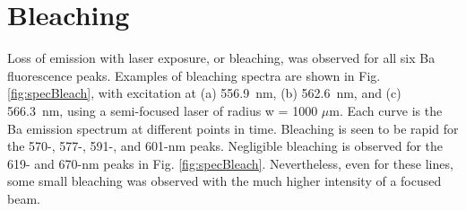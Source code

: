 


\section{Bleaching}
\label{sec:bleaching}

Loss of emission with laser exposure, or bleaching, was observed for all six Ba fluorescence peaks.  Examples of bleaching spectra are shown in Fig. \ref{fig:specBleach}, with excitation at (a) 556.9~nm, (b) 562.6~nm, and (c) 566.3~nm, using a semi-focused laser of radius w = 1000 $\mu$m.  Each curve is the Ba emission spectrum at different points in time.  Bleaching is seen to be rapid for the 570-, 577-, 591-, and 601-nm peaks.  Negligible bleaching is observed for the 619- and 670-nm peaks in Fig. \ref{fig:specBleach}.  Nevertheless, even for these lines, some small bleaching was observed with the much higher intensity of a focused beam.

